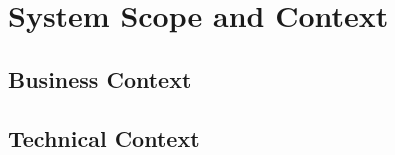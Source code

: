 \section{System Scope and Context}




\subsection{Business Context}





\subsection{Technical Context}


